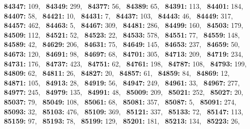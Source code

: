 \textbf{84347:} 109,\allowbreak~ 
\textbf{84349:} 299,\allowbreak~ 
\textbf{84377:} 56,\allowbreak~ 
\textbf{84389:} 65,\allowbreak~ 
\textbf{84391:} 113,\allowbreak~ 
\textbf{84401:} 184,\allowbreak~ 
\textbf{84407:} 58,\allowbreak~ 
\textbf{84421:} 10,\allowbreak~ 
\textbf{84431:} 7,\allowbreak~ 
\textbf{84437:} 103,\allowbreak~ 
\textbf{84443:} 46,\allowbreak~ 
\textbf{84449:} 317,\allowbreak~ 
\textbf{84457:} 462,\allowbreak~ 
\textbf{84463:} 5,\allowbreak~ 
\textbf{84467:} 309,\allowbreak~ 
\textbf{84481:} 286,\allowbreak~ 
\textbf{84499:} 160,\allowbreak~ 
\textbf{84503:} 179,\allowbreak~ 
\textbf{84509:} 112,\allowbreak~ 
\textbf{84521:} 52,\allowbreak~ 
\textbf{84523:} 22,\allowbreak~ 
\textbf{84533:} 578,\allowbreak~ 
\textbf{84551:} 77,\allowbreak~ 
\textbf{84559:} 148,\allowbreak~ 
\textbf{84589:} 42,\allowbreak~ 
\textbf{84629:} 206,\allowbreak~ 
\textbf{84631:} 75,\allowbreak~ 
\textbf{84649:} 145,\allowbreak~ 
\textbf{84653:} 237,\allowbreak~ 
\textbf{84659:} 50,\allowbreak~ 
\textbf{84673:} 120,\allowbreak~ 
\textbf{84691:} 98,\allowbreak~ 
\textbf{84697:} 68,\allowbreak~ 
\textbf{84701:} 305,\allowbreak~ 
\textbf{84713:} 209,\allowbreak~ 
\textbf{84719:} 234,\allowbreak~ 
\textbf{84731:} 176,\allowbreak~ 
\textbf{84737:} 423,\allowbreak~ 
\textbf{84751:} 62,\allowbreak~ 
\textbf{84761:} 198,\allowbreak~ 
\textbf{84787:} 108,\allowbreak~ 
\textbf{84793:} 199,\allowbreak~ 
\textbf{84809:} 62,\allowbreak~ 
\textbf{84811:} 26,\allowbreak~ 
\textbf{84827:} 20,\allowbreak~ 
\textbf{84857:} 61,\allowbreak~ 
\textbf{84859:} 84,\allowbreak~ 
\textbf{84869:} 12,\allowbreak~ 
\textbf{84871:} 105,\allowbreak~ 
\textbf{84913:} 28,\allowbreak~ 
\textbf{84919:} 56,\allowbreak~ 
\textbf{84947:} 249,\allowbreak~ 
\textbf{84961:} 33,\allowbreak~ 
\textbf{84967:} 277,\allowbreak~ 
\textbf{84977:} 245,\allowbreak~ 
\textbf{84979:} 135,\allowbreak~ 
\textbf{84991:} 48,\allowbreak~ 
\textbf{85009:} 209,\allowbreak~ 
\textbf{85021:} 252,\allowbreak~ 
\textbf{85027:} 20,\allowbreak~ 
\textbf{85037:} 79,\allowbreak~ 
\textbf{85049:} 108,\allowbreak~ 
\textbf{85061:} 68,\allowbreak~ 
\textbf{85081:} 357,\allowbreak~ 
\textbf{85087:} 5,\allowbreak~ 
\textbf{85091:} 274,\allowbreak~ 
\textbf{85093:} 32,\allowbreak~ 
\textbf{85103:} 476,\allowbreak~ 
\textbf{85109:} 369,\allowbreak~ 
\textbf{85121:} 337,\allowbreak~ 
\textbf{85133:} 72,\allowbreak~ 
\textbf{85147:} 113,\allowbreak~ 
\textbf{85159:} 97,\allowbreak~ 
\textbf{85193:} 78,\allowbreak~ 
\textbf{85199:} 129,\allowbreak~ 
\textbf{85201:} 181,\allowbreak~ 
\textbf{85213:} 134,\allowbreak~ 
\textbf{85223:} 26,\allowbreak~ 
